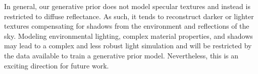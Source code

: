 


In general, our generative prior does not model specular textures and instead is restricted to diffuse reflectance. As such, it tends to reconstruct darker or lighter textures compensating for shadows from the environment and reflections of the sky. Modeling environmental lighting, complex material properties, and shadows may lead to a complex and less robust light simulation and will be restricted by the data available to train a generative prior model. Nevertheless, this is an exciting direction for future work.

% 


